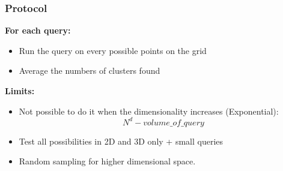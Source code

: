 \documentclass[slidestop,compress,red,mathserif]{beamer}
\begin{document}
\begin{frame}
 \frametitle{Protocol}

 \begin{scriptsize}
   \textbf{For each query:}
   \begin{itemize}

     \item Run the query on every possible points on the grid
     \item Average the numbers of clusters found

   \end{itemize}

   \textbf{Limits:}
   \begin{itemize}

     \item Not possible to do it when the dimensionality increases (Exponential):
     $$ N^d - volume\_of\_query $$
     \item Test all possibilities in 2D and 3D only + small queries
     \item Random sampling for higher dimensional space.

   \end{itemize}
 \end{scriptsize}
\end{frame}

\end{document}
